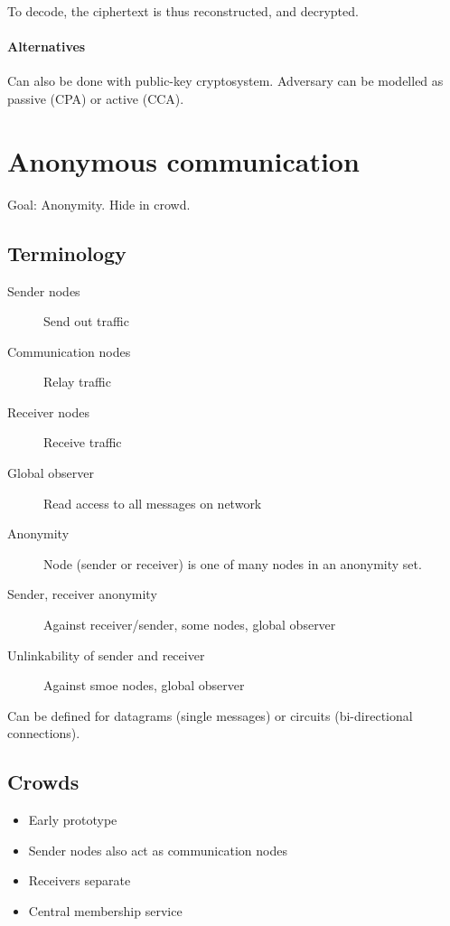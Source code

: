 \documentclass[a4paper]{scrreprt}
\begin{document}
To decode, the ciphertext is thus reconstructed, and decrypted.

\subsubsection{Alternatives}

Can also be done with public-key cryptosystem. Adversary can be modelled as
passive (CPA) or active (CCA).

\chapter{Anonymous communication}

Goal: Anonymity. Hide in crowd.

\section{Terminology}

\begin{description}
		\item[Sender nodes] Send out traffic
		\item[Communication nodes] Relay traffic
		\item[Receiver nodes] Receive traffic
		\item[Global observer] Read access to all messages on network
		\item[Anonymity] Node (sender or receiver) is one of many nodes in an
				anonymity set.
		\item[Sender, receiver anonymity] Against receiver/sender, some nodes,
				global observer
		\item[Unlinkability of sender and receiver] Against smoe nodes, global
				observer
\end{description}

Can be defined for datagrams (single messages) or circuits (bi-directional
connections).

\section{Crowds}

\begin{itemize}
		\item Early prototype
		\item Sender nodes also act as communication nodes
		\item Receivers separate
		\item Central membership service
\end{itemize}
\end{document}

